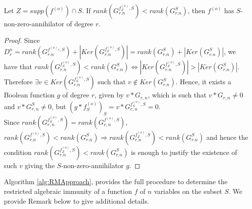 \documentclass[11pt]{llncs}
\begin{document}
\begin{proposition}\label{prop:compareranks}
	Let $Z = supp\left(f^{(o)}\right) \cap S$.
	If $rank\left(G^{f_{Z}^{(o)},S}_{r.n}\right) < rank(G^{S}_{r.n})$, then $f^{(o)}$ has $S$-non-zero-annihilator of degree $r$.
\end{proposition}
\begin{proof}
	Since $D_r^n = rank(G^{f^{(o)_S},S}_{r.n}) + |Ker(G^{f^{(o)}_S,S}_{r.n})| =  rank(G^{S}_{r.n}) + |Ker(G^{S}_{r.n})|$, we have that
	$rank(G^{f_S^{(o)},S}_{r.n}) < rank(G^{S}_{r.n}) \iff |Ker(G^{f_S^{(o)},S}_{r.n})| > |Ker(G^{S}_{r.n})|$. Therefore $\exists v\in Ker(G^{f_S^{(o)},S}_{r.n}) \mbox{ such that }v\not\in Ker(G^{S}_{r.n})$. Hence, it exists a Boolean function $g$ of degree $r$, given by $v*G_{r,n}$, which is such that $v*G_{r,n}\neq 0$ and $v*G_{r,n}^{S}\neq 0$, but $(g*f_S^{(o)})_S = v*G_{r,n}^{f_S^{(o)},S} = 0$.\\
	Since $rank\left(G_{r,n}^{f_S^{(o)}, S}\right) = rank\left(G_{r,n}^{f^{(o)}, S}\right)$, $rank(G^{f^{(o)},S}_{r.n}) < rank(G^{S}_{r.n}) \Rightarrow rank(G^{f_Z^{(o)},S}_{r.n}) < rank(G^{S}_{r.n})$ and hence the condition $rank(G^{f_Z^{(o)},S}_{r.n}) < rank(G^{S}_{r.n})$ is enough to justify the existence of such $v$ giving the $S$-non-zero-annihilator $g$.
\end{proof}

Algorithm \ref{alg:RMApproach}, provides the full procedure to determine the restricted algebraic immunity of a function $f$ of $n$ variables on the subset $S$. We provide Remark below to give additional details.
\end{document}
